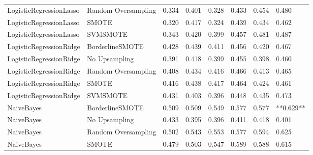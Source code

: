 \begin{tabular}{llllllll}
     LogisticRegressionLasso & Random Oversampling & 0.334 &                     0.401 &                 0.328 &                  0.433 &                                   0.454 &     0.480 \\
     LogisticRegressionLasso &               SMOTE & 0.320 &                     0.417 &                 0.324 &                  0.439 &                                   0.434 &     0.462 \\
     LogisticRegressionLasso &            SVMSMOTE & 0.343 &                     0.420 &                 0.399 &                  0.457 &                                   0.481 &     0.487 \\
     LogisticRegressionRidge &     BorderlineSMOTE & 0.428 &                     0.439 &                 0.411 &                  0.456 &                                   0.420 &     0.467 \\
     LogisticRegressionRidge &       No Upsampling & 0.391 &                     0.418 &                 0.399 &                  0.455 &                                   0.398 &     0.460 \\
     LogisticRegressionRidge & Random Oversampling & 0.408 &                     0.434 &                 0.416 &                  0.466 &                                   0.413 &     0.465 \\
     LogisticRegressionRidge &               SMOTE & 0.416 &                     0.438 &                 0.417 &                  0.464 &                                   0.424 &     0.461 \\
     LogisticRegressionRidge &            SVMSMOTE & 0.431 &                     0.403 &                 0.396 &                  0.448 &                                   0.435 &     0.473 \\
                  NaiveBayes &     BorderlineSMOTE & 0.509 &                     0.509 &                 0.549 &                  0.577 &                                   0.577 & **0.629** \\
                  NaiveBayes &       No Upsampling & 0.433 &                     0.395 &                 0.396 &                  0.411 &                                   0.418 &     0.401 \\
                  NaiveBayes & Random Oversampling & 0.502 &                     0.543 &                 0.553 &                  0.577 &                                   0.594 &     0.625 \\
                  NaiveBayes &               SMOTE & 0.479 &                     0.503 &                 0.547 &                  0.589 &                                   0.588 &     0.615 \\

\end{tabular}
